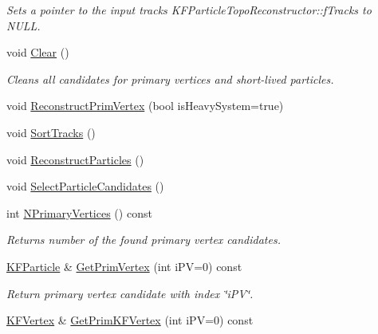\begin{DoxyCompactItemize}
\begin{DoxyCompactList}\small\item\em Sets a pointer to the input tracks K\+F\+Particle\+Topo\+Reconstructor\+::f\+Tracks to N\+U\+LL. \end{DoxyCompactList}\item 
void \hyperlink{classKFParticleTopoReconstructor_a6b85e2a706f83088c422685b65a5291f}{Clear} ()\hypertarget{classKFParticleTopoReconstructor_a6b85e2a706f83088c422685b65a5291f}{}\label{classKFParticleTopoReconstructor_a6b85e2a706f83088c422685b65a5291f}

\begin{DoxyCompactList}\small\item\em Cleans all candidates for primary vertices and short-\/lived particles. \end{DoxyCompactList}\item 
void \hyperlink{classKFParticleTopoReconstructor_a7ea70e983164efab0ccbfca2c12c03af}{Reconstruct\+Prim\+Vertex} (bool is\+Heavy\+System=true)
\item 
void \hyperlink{classKFParticleTopoReconstructor_a35f6755e97c39e1e00373272d1546f36}{Sort\+Tracks} ()
\item 
void \hyperlink{classKFParticleTopoReconstructor_a3013eefd4e16b74ae39c531678623d08}{Reconstruct\+Particles} ()
\item 
void \hyperlink{classKFParticleTopoReconstructor_ab6e474eb923fc715a9bfba891436de48}{Select\+Particle\+Candidates} ()
\item 
int \hyperlink{classKFParticleTopoReconstructor_a871e14b076dfab861a09b150c71e3bca}{N\+Primary\+Vertices} () const \hypertarget{classKFParticleTopoReconstructor_a871e14b076dfab861a09b150c71e3bca}{}\label{classKFParticleTopoReconstructor_a871e14b076dfab861a09b150c71e3bca}

\begin{DoxyCompactList}\small\item\em Returns number of the found primary vertex candidates. \end{DoxyCompactList}\item 
\hyperlink{classKFParticle}{K\+F\+Particle} \& \hyperlink{classKFParticleTopoReconstructor_a0e776d559d48e57679c69fa248d3092c}{Get\+Prim\+Vertex} (int i\+PV=0) const \hypertarget{classKFParticleTopoReconstructor_a0e776d559d48e57679c69fa248d3092c}{}\label{classKFParticleTopoReconstructor_a0e776d559d48e57679c69fa248d3092c}

\begin{DoxyCompactList}\small\item\em Return primary vertex candidate with index \char`\"{}i\+P\+V\char`\"{}. \end{DoxyCompactList}\item 
\hyperlink{classKFVertex}{K\+F\+Vertex} \& \hyperlink{classKFParticleTopoReconstructor_a38a14f093d258640e1c6b736794c659e}{Get\+Prim\+K\+F\+Vertex} (int i\+PV=0) const \hypertarget{classKFParticleTopoReconstructor_a38a14f093d258640e1c6b736794c659e}{}\label{classKFParticleTopoReconstructor_a38a14f093d258640e1c6b736794c659e}


\end{DoxyCompactItemize}
